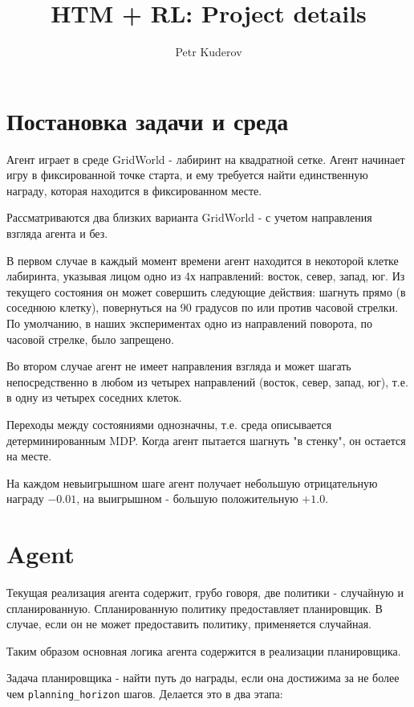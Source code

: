 \documentclass[a4paper]{article}
\begin{document}
\title {HTM + RL: Project details}
\author {Petr Kuderov}
\maketitle

\section {Постановка задачи и среда}

Агент играет в среде GridWorld - лабиринт на квадратной сетке. Агент начинает игру в фиксированной точке старта, и ему требуется найти единственную награду, которая находится в фиксированном месте.

Рассматриваются два близких варианта GridWorld - с учетом направления взгляда агента и без.

В первом случае в каждый момент времени агент находится в некоторой клетке лабиринта, указывая лицом одно из 4х направлений: восток, север, запад, юг. Из текущего состояния он может совершить следующие действия: шагнуть прямо (в соседнюю клетку), повернуться на 90 градусов по или против часовой стрелки. По умолчанию, в наших экспериментах одно из направлений поворота, по часовой стрелке, было запрещено.

Во втором случае агент не имеет направления взгляда и может шагать непосредственно в любом из четырех направлений (восток, север, запад, юг), т.е. в одну из четырех соседних клеток.

Переходы между состояниями однозначны, т.е. среда описывается детерминированным MDP. Когда агент пытается шагнуть "в стенку", он остается на месте.

На каждом невыигрышном шаге агент получает небольшую отрицательную награду $-0.01$, на выигрышном - большую положительную $+1.0$.

\section{Agent}

Текущая реализация агента содержит, грубо говоря, две политики - случайную и спланированную. Спланированную политику предоставляет планировщик. В случае, если он не может предоставить политику, применяется случайная.

Таким образом основная логика агента содержится в реализации планировщика.

Задача планировщика - найти путь до награды, если она достижима за не более чем \verb|planning_horizon| шагов. Делается это в два этапа:
\end{document}
